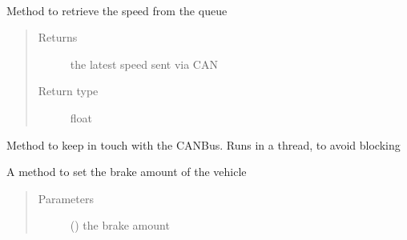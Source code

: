 \documentclass[letterpaper,10pt,english]{sphinxmanual}
\begin{document}

\begin{fulllineitems}
\label{\detokenize{driver:lib.driver.CanBus}}~

\begin{fulllineitems}
\label{\detokenize{driver:lib.driver.CanBus.get_speed}}
Method to retrieve the speed from the queue
\begin{quote}\begin{description}
\item[{Returns}] \leavevmode
the latest speed sent via CAN

\item[{Return type}] \leavevmode
float

\end{description}\end{quote}

\end{fulllineitems}


\begin{fulllineitems}
\label{\detokenize{driver:lib.driver.CanBus.run_forever}}
Method to keep in touch with the CAN\sphinxhyphen{}Bus. Runs in a thread, to avoid blocking

\end{fulllineitems}


\begin{fulllineitems}
\label{\detokenize{driver:lib.driver.CanBus.set_brake}}
A method to set the brake amount of the vehicle
\begin{quote}\begin{description}
\item[{Parameters}] \leavevmode
{} () \textendash{} the brake amount


\end{description}
\end{quote}
\end{fulllineitems}
\end{fulllineitems}
\end{document}
